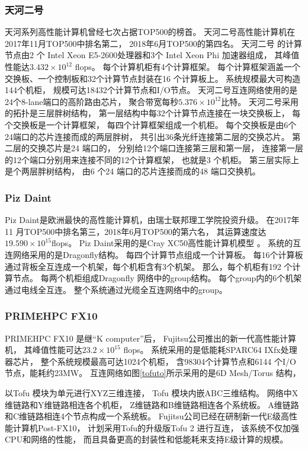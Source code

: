 \subsubsection{天河二号}
天河系列高性能计算机曾经七次占据TOP500的榜首。
天河二号高性能计算机在2017年11月TOP500中排名第二，
2018年6月TOP500的第四名。
天河二号 的计算节点由2 个
Intel Xeon E5-2600处理器和3个 Intel Xeon Phi 加速器组成，
其峰值性能达$3.432\times10^{12}$ flops。
每个计算机柜有4个计算框架。
每个计算框架涵盖一个交换板、一个控制板和32个计算节点封装在16 个计算板上。
系统规模最大可构造144个机柜，
规模可达18432个计算节点和I/O节点。
天河二号互连网络使用的是24个8-lane端口的高阶路由芯片，
聚合带宽每秒$5.376\times10^{12}$比特。
天河二号采用的拓扑是三层胖树结构，
第一层结构中每32个计算节点连接在一块交换板上，
每个交换板是一个计算框架，
每四个计算框架组成一个机柜。
每个交换板是由6个24端口的芯片连接而成的两层胖树，
共引出36条光纤连接第二层的交换芯片。
第二层的交换芯片是24 端口的，
分别给12个端口连接第三层和第一层，
连接第一层的12个端口分别用来连接不同的12个计算框架，
也就是3 个机柜。
第三层实际上是个两层胖树结构，
由6 个24 端口的芯片连接而成的48 端口交换机。

\subsubsection{Piz Daint}
Piz Daint是欧洲最快的高性能计算机，由瑞士联邦理工学院投资升级。
在2017年11 月TOP500中排名第三，2018年6月TOP500的第六名，
其运算速度达$19.590\times10^{15}$flops。
Piz Daint采用的是Cray XC50高性能计算机模型 。
系统的互连网络采用的是Dragonfly结构。
每四个计算节点组成一个计算板。
每16个计算板通过背板全互连成一个机架，每个机柜含有3个机架。
那么，每个机柜有192 个计算节点。
每两个机柜组成Dragonfly 网络中的group结构。
每个group内的6个机架通过电线全互连。
整个系统通过光缆全互连网络中的group。

\subsubsection{PRIMEHPC FX10}
PRIMEHPC FX10 是继“K computer”后，
Fujitsu公司推出的新一代高性能计算机，
其峰值性能可达$23.2\times10^{15}$ flops。
系统采用的是低能耗SPARC64 IXfx处理器芯片，
整个系统规模最高可达1024个机柜，
含98304个计算节点和6144 个I/O节点，能耗约23MW。
互连网络如图\ref{tofuto}所示采用的是6D Mesh/Torus 结构，

以Tofu 模块为单元进行XYZ三维连接，
Tofu 模块内嵌ABC三维结构。
网络中X维链路和Y维链路相连各个机柜，
Z维链路和B维链路相连各个系统板。
A维链路和C维链路相连4个节点构成一个系统板。
Fujitsu公司已经在研制新一代E级高性能计算机Post-FX10，
计划采用Tofu的升级版Tofu 2 进行互连，
该系统不仅加强CPU和网络的性能，
而且具备更高的封装性和低能耗来支持E级计算的规模。

